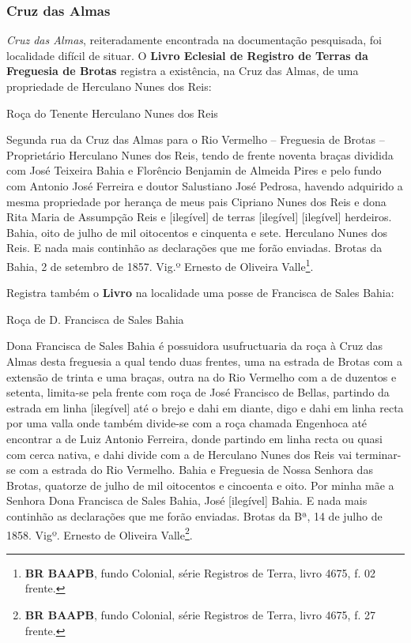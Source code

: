 \subsubsection{Cruz das Almas}\label{subsubsec:cruzalm}

\textit{Cruz das Almas}, reiteradamente encontrada na documentação pesquisada, foi localidade difícil de situar. O \textbf{Livro Eclesial de Registro de Terras da Freguesia de Brotas} registra a existência, na Cruz das Almas, de uma propriedade de Herculano Nunes dos Reis:

\begin{citacao}
Roça do Tenente Herculano Nunes dos Reis

Segunda rua da Cruz das Almas para o Rio Vermelho -- Freguesia de Brotas -- Proprietário Herculano Nunes dos Reis, tendo de frente noventa braças dividida com José Teixeira Bahia e Florêncio Benjamin de Almeida Pires e pelo fundo com Antonio José Ferreira e doutor Salustiano José Pedrosa, havendo adquirido a mesma propriedade por herança de meus pais Cipriano Nunes dos Reis e dona Rita Maria de Assumpção Reis e [ilegível] de terras [ilegível] [ilegível] herdeiros. Bahia, oito de julho de mil oitocentos e cinquenta e sete. Herculano Nunes dos Reis. E nada mais continhão as declarações que me forão enviadas. Brotas da Bahia, 2 de setembro de 1857. Vig.º Ernesto de Oliveira Valle\footnote{\textbf{BR BAAPB}, fundo Colonial, série Registros de Terra, livro 4675, f. 02 frente.}.
\end{citacao}

Registra também o \textbf{Livro} na localidade uma posse de Francisca de Sales Bahia:

\begin{citacao}
Roça de D. Francisca de Sales Bahia

Dona Francisca de Sales Bahia é possuidora usufructuaria da roça à Cruz das Almas desta freguesia a qual tendo duas frentes, uma na estrada de Brotas com a extensão de trinta e uma braças, outra na do Rio Vermelho com a de duzentos e setenta, limita-se pela frente com roça de José Francisco de Bellas, partindo da estrada em linha [ilegível] até o brejo e dahi em diante, digo e dahi em linha recta por uma valla onde também divide-se com a roça chamada Engenhoca até encontrar a de Luiz Antonio Ferreira, donde partindo em linha recta ou quasi com cerca nativa, e dahi divide com a de Herculano Nunes dos Reis vai terminar-se com a estrada do Rio Vermelho. Bahia e Freguesia de Nossa Senhora das Brotas, quatorze de julho de mil oitocentos e cincoenta e oito. Por minha mãe a Senhora Dona Francisca de Sales Bahia, José [ilegível] Bahia. E nada mais continhão as declarações que me forão enviadas. Brotas da Bª, 14 de julho de 1858. Vigº. Ernesto de Oliveira Valle\footnote{\textbf{BR BAAPB}, fundo Colonial, série Registros de Terra, livro 4675, f. 27 frente.}.
\end{citacao}

